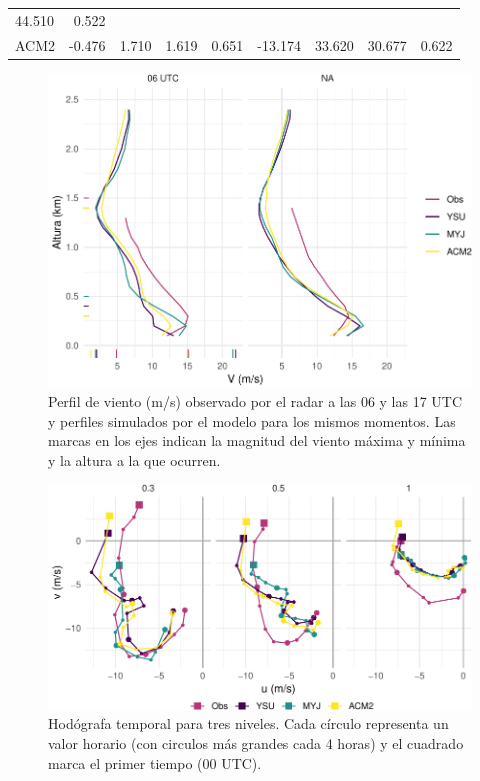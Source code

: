 \documentclass[12pt,spanish,oneside, a4paper]{book}
\begin{document}
\begin{table}
\begin{tabular}[t]{lrrrrrrrr}
 44.510 & 0.522\\
ACM2 & -0.476 & 1.710 & 1.619 & 0.651 & -13.174 & 33.620 & 30.677 & 0.622\\
\bottomrule
\end{tabular}
\end{table}

\begin{figure}

{\centering \includegraphics{00_Paper_files/figure-latex/perfiles-mod-1} 

}

\caption{Perfil de viento (m/s) observado por el radar a las 06 y las 17 UTC y perfiles simulados por el modelo para los mismos momentos. Las marcas en los ejes indican la magnitud del viento máxima y mínima y la altura a la que ocurren. \label{perfil-mod}}\label{fig:perfiles-mod}
\end{figure}

\begin{figure}

{\centering \includegraphics{00_Paper_files/figure-latex/hodografa-wrf-1} 

}

\caption{Hodógrafa temporal para tres niveles. Cada círculo representa un valor horario (con circulos más grandes cada 4 horas) y el cuadrado marca el primer tiempo (00 UTC). \label{hodografa-mod}}\label{fig:hodografa-wrf}
\end{figure}
\end{document}
